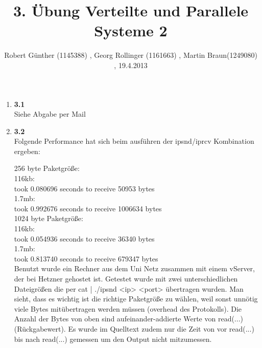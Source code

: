 \documentclass[10pt,a4paper]{article} [2003/01/01]
\title{3. Übung Verteilte und Parallele Systeme 2}
\author{ Robert Günther (1145388) , Georg Rollinger (1161663) , Martin Braun(1249080) , 19.4.2013}
\date{}
\begin{document}
\maketitle
\begin{enumerate}

\item[]{\textbf{3.1}
\\Siehe Abgabe per Mail
}

\item[]{\textbf{3.2}
\\Folgende Performance hat sich beim ausführen der ipsnd/iprcv Kombination ergeben:

256 byte Paketgröße:\\
	116kb:\\
	took 0.080696 seconds to receive 50953 bytes\\
	1.7mb:\\
	took 0.992676 seconds to receive 1006634 bytes\\
1024 byte Paketgröße:\\
	116kb:\\
	took 0.054936 seconds to receive 36340 bytes\\
	1.7mb:\\
	took 0.813740 seconds to receive 679347 bytes\\

Benutzt wurde ein Rechner aus dem Uni Netz zusammen mit einem vServer,
der bei Hetzner gehostet ist. Getestet wurde mit zwei unterschiedlichen
Dateigrößen die per cat | ./ipsnd <ip> <port> übertragen wurden. Man
sieht, dass es wichtig ist die richtige Paketgröße zu wählen, weil sonst
unnötig viele Bytes mitübertragen werden müssen (overhead des Protokolls).
Die Anzahl der Bytes von oben sind aufeinander-addierte Werte von read(...)
(Rückgabewert). Es wurde im Quelltext zudem nur die Zeit von vor read(...)
bis nach read(...) gemessen um den Output nicht mitzumessen.

}



\end{enumerate}
\end{document}

